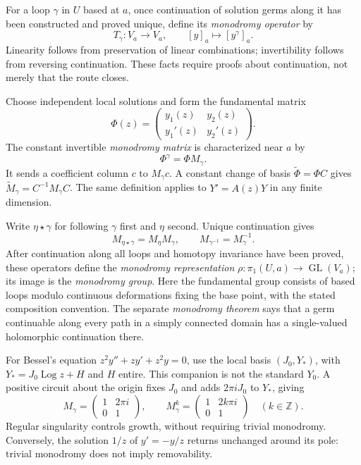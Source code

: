 For a loop $\gamma$ in $U$ based at $a$, once continuation of solution germs
along it has been constructed and proved unique, define its
\emph{monodromy operator} by
\[
 T_\gamma:V_a\longrightarrow V_a,\qquad [y]_a\longmapsto[y^\gamma]_a.
\]
Linearity follows from preservation of linear combinations; invertibility
follows from reversing continuation. These facts require proofs about
continuation, not merely that the route closes.

Choose independent local solutions and form the fundamental matrix
\[
 \Phi(z)=\begin{pmatrix}y_1(z)&y_2(z)\\y_1'(z)&y_2'(z)\end{pmatrix}.
\]
The constant invertible \emph{monodromy matrix} is characterized near $a$ by
\[
 \Phi^\gamma=\Phi M_\gamma.
\]
It sends a coefficient column $c$ to $M_\gamma c$. A constant change of
basis $\widetilde\Phi=\Phi C$ gives
$\widetilde M_\gamma=C^{-1}M_\gamma C$.
The same definition applies to $Y'=A(z)Y$ in any finite dimension.

Write $\eta\star\gamma$ for following $\gamma$ first and $\eta$ second.
Unique continuation gives
\[
 M_{\eta\star\gamma}=M_\eta M_\gamma,\qquad
 M_{\gamma^{-1}}=M_\gamma^{-1}.
\]
After continuation along all loops and homotopy invariance have been proved,
these operators define the \emph{monodromy representation}
$\rho:\pi_1(U,a)\to\operatorname{GL}(V_a)$; its image is the
\emph{monodromy group}. Here the fundamental group consists of based loops
modulo continuous deformations fixing the base point, with the stated
composition convention. The separate \emph{monodromy theorem} says that a
germ continuable along every path in a simply connected domain has a
single-valued holomorphic continuation there.

For Bessel's equation $z^2y''+zy'+z^2y=0$, use the local basis
$(J_0,Y_*)$, with $Y_*=J_0\operatorname{Log}z+H$ and $H$ entire.
This companion is not the standard $Y_0$. A positive circuit about the
origin fixes $J_0$ and adds $2\pi iJ_0$ to $Y_*$, giving
\[
 M_\gamma=\begin{pmatrix}1&2\pi i\\0&1\end{pmatrix},\qquad
 M_\gamma^k=\begin{pmatrix}1&2k\pi i\\0&1\end{pmatrix}
 \quad(k\in\mathbb Z).
\]
Regular singularity controls growth, without requiring trivial monodromy.
Conversely, the solution $1/z$ of $y'=-y/z$ returns unchanged around its
pole: trivial monodromy does not imply removability.

